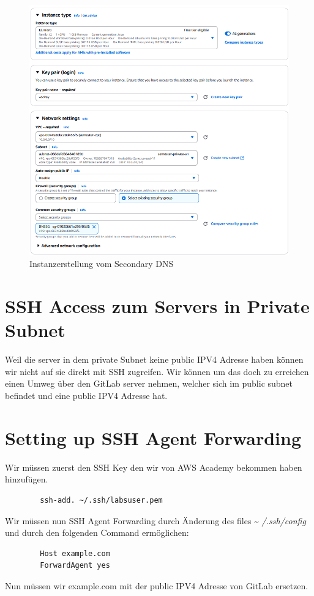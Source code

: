 \documentclass[a4paper,12pt]{article}
\begin{document}
\begin{figure}[H]
	\centering
	\includegraphics[width=\textwidth]{data/Launch_Instance_DNS_Secondary2.png}
	\caption{Instanzerstellung vom Secondary DNS}
	\label{fig:Instanzecreation vom Secondary DNS2}
\end{figure}

\section{SSH Access zum Servers in Private Subnet}
Weil die server in dem private Subnet keine public IPV4 Adresse haben können wir nicht auf sie direkt mit SSH zugreifen. 
Wir können um das doch zu erreichen einen Umweg über den GitLab server nehmen, welcher sich im public subnet befindet und eine public IPV4 Adresse hat.

\section{Setting up SSH Agent Forwarding}
Wir müssen zuerst den SSH Key den wir von AWS Academy bekommen haben hinzufügen.
\begin{verbatim}
		ssh-add. ~/.ssh/labsuser.pem
\end{verbatim}

Wir müssen nun SSH Agent Forwarding durch Änderung des files \~{} \textit{/.ssh/config} und durch den folgenden Command ermöglichen:
\begin{verbatim}
		Host example.com 
		ForwardAgent yes
\end{verbatim}
Nun müssen wir example.com mit der public IPV4 Adresse von GitLab ersetzen.
\end{document}
